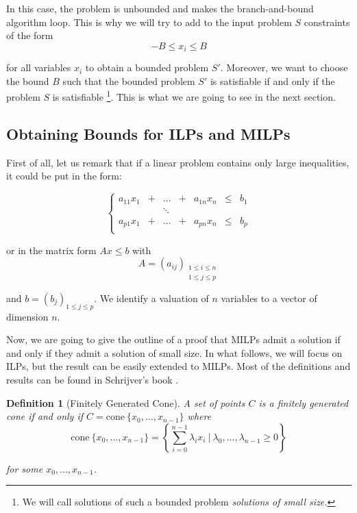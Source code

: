 \documentclass{article}
\newcommand{\cone}{\mathrm{cone}}
\newcommand{\ifff}{if and only if}
\newtheorem{definition}{Definition}
\begin{document}
In this case, the problem is unbounded and makes the branch-and-bound algorithm
loop. This is why we will try to add to the input problem $S$ constraints of
the form $$-B \leqslant x_i \leqslant B$$

for all variables $x_i$ to obtain a bounded problem $S'$.
Moreover, we want to choose the bound $B$ such that
the bounded problem $S'$ is satisfiable if and only if the problem $S$
is satisfiable \footnote{We will call solutions of such a bounded
problem \textit{solutions of small size.}}. 
This is what we are going to see in the next section.

\subsection{Obtaining Bounds for ILPs and MILPs}
\label{schrijverbnd}
First of all, let us remark that if a linear problem contains only 
large inequalities, it could be put in the form:

\begin{displaymath}
  \left\{
  \begin{array}{ccccccl}
    a_{11} x_1 & + & ...    & + & a_{1n} x_n & \leqslant & b_1 \\
               &   & \ddots &   &            &           &     \\
    a_{p1} x_1 & + & ...    & + & a_{pn} x_n & \leqslant & b_p \\
  \end{array}
  \right.
\end{displaymath}

or in the matrix form $Ax \leqslant b$ with
$$A = (a_{ij})_{\substack{1 \leqslant i \leqslant n \\
                          1 \leqslant j \leqslant p}}$$
                          
and
$b = (b_j)_{1 \leqslant j \leqslant p}$. We identify a valuation of $n$
variables to a vector of dimension $n$.

Now, we are going to give the outline of a proof that MILPs admit a solution
if and only if they admit a solution of small size. In what follows, we will
focus on ILPs, but the result can be easily extended to MILPs. Most of the
definitions and results can be found in Schrijver's book
\cite[Sections 7 and 16]{Schrijver1998}.

\begin{definition}[Finitely Generated Cone]
  A set of points $C$ is a \textsl{finitely generated cone}
  \ifff{} $C = \cone~\{x_0, ..., x_{n-1}\}$ where
  $$\cone~\{x_0, ..., x_{n-1}\} =
      \left\{\sum_{i=0}^{n-1} \lambda_i x_i~|~
               \lambda_0, ..., \lambda_{n-1} \geqslant 0\right\}
  $$

  for some $x_0, ..., x_{n-1}$.
\end{definition}
\end{document}
